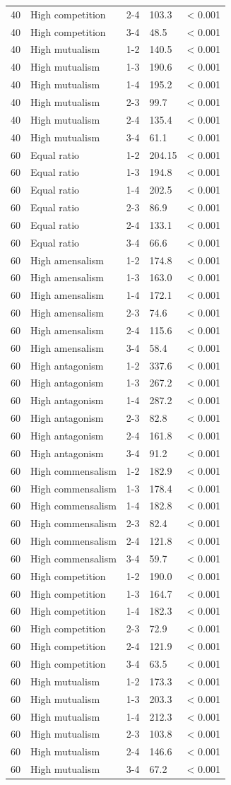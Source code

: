 \begin{longtable}[]{@{}lllll@{}}
40 & High competition & 2-4 & 103.3 & \textless{} 0.001\tabularnewline
40 & High competition & 3-4 & 48.5 & \textless{} 0.001\tabularnewline
40 & High mutualism & 1-2 & 140.5 & \textless{} 0.001\tabularnewline
40 & High mutualism & 1-3 & 190.6 & \textless{} 0.001\tabularnewline
40 & High mutualism & 1-4 & 195.2 & \textless{} 0.001\tabularnewline
40 & High mutualism & 2-3 & 99.7 & \textless{} 0.001\tabularnewline
40 & High mutualism & 2-4 & 135.4 & \textless{} 0.001\tabularnewline
40 & High mutualism & 3-4 & 61.1 & \textless{} 0.001\tabularnewline
60 & Equal ratio & 1-2 & 204.15 & \textless{} 0.001\tabularnewline
60 & Equal ratio & 1-3 & 194.8 & \textless{} 0.001\tabularnewline
60 & Equal ratio & 1-4 & 202.5 & \textless{} 0.001\tabularnewline
60 & Equal ratio & 2-3 & 86.9 & \textless{} 0.001\tabularnewline
60 & Equal ratio & 2-4 & 133.1 & \textless{} 0.001\tabularnewline
60 & Equal ratio & 3-4 & 66.6 & \textless{} 0.001\tabularnewline
60 & High amensalism & 1-2 & 174.8 & \textless{} 0.001\tabularnewline
60 & High amensalism & 1-3 & 163.0 & \textless{} 0.001\tabularnewline
60 & High amensalism & 1-4 & 172.1 & \textless{} 0.001\tabularnewline
60 & High amensalism & 2-3 & 74.6 & \textless{} 0.001\tabularnewline
60 & High amensalism & 2-4 & 115.6 & \textless{} 0.001\tabularnewline
60 & High amensalism & 3-4 & 58.4 & \textless{} 0.001\tabularnewline
60 & High antagonism & 1-2 & 337.6 & \textless{} 0.001\tabularnewline
60 & High antagonism & 1-3 & 267.2 & \textless{} 0.001\tabularnewline
60 & High antagonism & 1-4 & 287.2 & \textless{} 0.001\tabularnewline
60 & High antagonism & 2-3 & 82.8 & \textless{} 0.001\tabularnewline
60 & High antagonism & 2-4 & 161.8 & \textless{} 0.001\tabularnewline
60 & High antagonism & 3-4 & 91.2 & \textless{} 0.001\tabularnewline
60 & High commensalism & 1-2 & 182.9 & \textless{} 0.001\tabularnewline
60 & High commensalism & 1-3 & 178.4 & \textless{} 0.001\tabularnewline
60 & High commensalism & 1-4 & 182.8 & \textless{} 0.001\tabularnewline
60 & High commensalism & 2-3 & 82.4 & \textless{} 0.001\tabularnewline
60 & High commensalism & 2-4 & 121.8 & \textless{} 0.001\tabularnewline
60 & High commensalism & 3-4 & 59.7 & \textless{} 0.001\tabularnewline
60 & High competition & 1-2 & 190.0 & \textless{} 0.001\tabularnewline
60 & High competition & 1-3 & 164.7 & \textless{} 0.001\tabularnewline
60 & High competition & 1-4 & 182.3 & \textless{} 0.001\tabularnewline
60 & High competition & 2-3 & 72.9 & \textless{} 0.001\tabularnewline
60 & High competition & 2-4 & 121.9 & \textless{} 0.001\tabularnewline
60 & High competition & 3-4 & 63.5 & \textless{} 0.001\tabularnewline
60 & High mutualism & 1-2 & 173.3 & \textless{} 0.001\tabularnewline
60 & High mutualism & 1-3 & 203.3 & \textless{} 0.001\tabularnewline
60 & High mutualism & 1-4 & 212.3 & \textless{} 0.001\tabularnewline
60 & High mutualism & 2-3 & 103.8 & \textless{} 0.001\tabularnewline
60 & High mutualism & 2-4 & 146.6 & \textless{} 0.001\tabularnewline
60 & High mutualism & 3-4 & 67.2 & \textless{} 0.001\tabularnewline
\bottomrule

\end{longtable}

